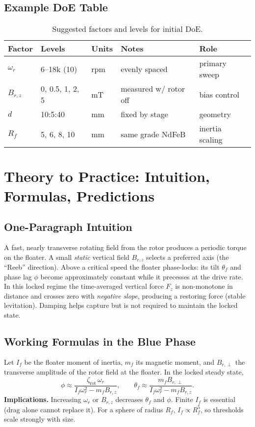 \documentclass[11pt]{article}
\theoremstyle{definition}
\theoremstyle{plain}
\begin{document}
\subsection{Example DoE Table}
\begin{table}[h]
  \centering
  \begin{tabular}{@{}lllll@{}}
    \toprule
    Factor & Levels & Units & Notes & Role \\
    \midrule
    \(\omega_r\) & 6--18k (10) & rpm & evenly spaced & primary sweep \\
    \(B_{r,z}\) & 0, 0.5, 1, 2, 5 & mT & measured w/ rotor off & bias control \\
    \(d\) & 10:5:40 & mm & fixed by stage & geometry \\
    \(R_f\) & 5, 6, 8, 10 & mm & same grade NdFeB & inertia scaling \\
    \bottomrule
  \end{tabular}
  \caption{Suggested factors and levels for initial DoE.}
\end{table}

\section{Theory to Practice: Intuition, Formulas, Predictions}
\label{sec:theory2practice}

\subsection{One-Paragraph Intuition}
A fast, nearly transverse rotating field from the rotor produces a periodic torque on the floater. A small \emph{static} vertical field \(B_{r,z}\) selects a preferred axis (the ``Reeb'' direction). Above a critical speed the floater phase-locks: its tilt \(\theta_f\) and phase lag \(\phi\) become approximately constant while it precesses at the drive rate. In this locked regime the time-averaged vertical force \(F_z\) is non-monotone in distance and crosses zero with \emph{negative slope}, producing a restoring force (stable levitation). Damping helps capture but is not required to maintain the locked state.

\subsection{Working Formulas in the Blue Phase}
Let \(I_f\) be the floater moment of inertia, \(m_f\) its magnetic moment, and \(B_{r,\perp}\) the transverse amplitude of the rotor field at the floater. In the locked steady state,
\begin{equation}
  \label{eq:phi-theta}
  \phi \approx \frac{\zeta_{\mathrm{rot}}\,\omega_r}{I_f\omega_r^2 - m_f B_{r,z}},
  \qquad
  \theta_f \approx \frac{m_f B_{r,\perp}}{I_f\omega_r^2 - m_f B_{r,z}}.
\end{equation}
\textbf{Implications.} Increasing \(\omega_r\) or \(B_{r,z}\) decreases \(\theta_f\) and \(\phi\). Finite \(I_f\) is essential (drag alone cannot replace it). For a sphere of radius \(R_f\), \(I_f\propto R_f^5\), so thresholds scale strongly with size.
\end{document}
